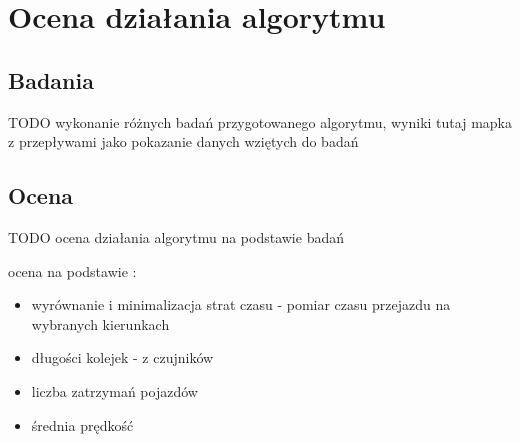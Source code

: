 \chapter{Ocena działania algorytmu}
\section{Badania}
TODO wykonanie różnych badań przygotowanego algorytmu, wyniki
tutaj mapka z przepływami jako pokazanie danych wziętych do badań

\section{Ocena}
\label{chap:ocena}
TODO ocena działania algorytmu na podstawie badań

ocena na podstawie \cite{kawalec+sobieszuk-durka}:
\begin{itemize}
\item wyrównanie i minimalizacja strat czasu - pomiar czasu przejazdu na wybranych kierunkach
\item długości kolejek - z czujników
\item liczba zatrzymań pojazdów
\item średnia prędkość
\end{itemize}